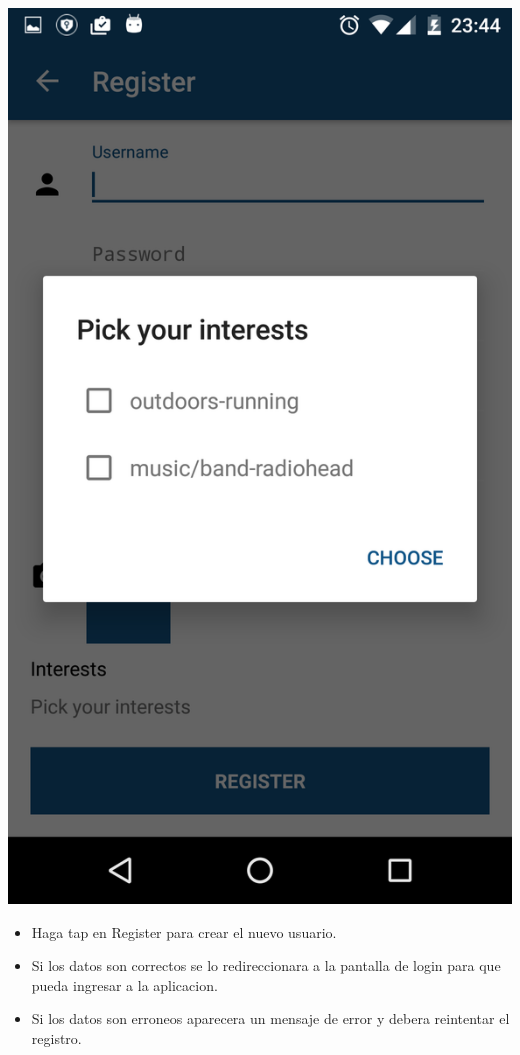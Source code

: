 \documentclass[letterpaper,10pt,english]{sphinxmanual}
\begin{document}
\includegraphics{interests.png}
\begin{itemize}
\item {} 
Haga tap en Register para crear el nuevo usuario.

\item {} 
Si los datos son correctos se lo redireccionara a la pantalla de login para que pueda ingresar a la aplicacion.

\item {} 
Si los datos son erroneos aparecera un mensaje de error y debera reintentar el registro.

\end{itemize}
\end{document}
